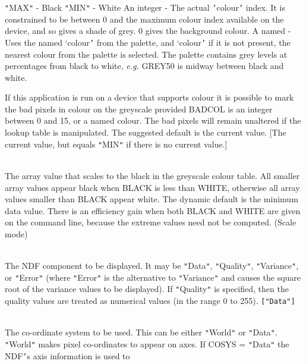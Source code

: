 \documentclass[twoside,11pt]{article}
\newcommand{\sstsubsection}[1]{ \item[{#1}] \mbox{} \\}
\newcommand{\sstsubsection}[1]{\item[{#1}]}
\begin{document}
{{{           {\tt "}MAX{\tt "}       - Black
           {\tt "}MIN{\tt "}       - White
           An integer  - The actual {\tt '}colour{\tt '} index.  It is constrained
                         to be between 0 and the maximum colour index
                         available on the device, and so gives a shade
                         of grey.  0 gives the background colour.
           A named     - Uses the named `colour{\tt '} from the palette, and
           `colour{\tt '}      if it is not present, the nearest colour from
                         the palette is selected.  The palette contains
                         grey levels at percentages from black to white,
                         \emph{e.g.} GREY50 is midway between black and white.

         If this application is run on a device that supports colour
         it is possible to mark the bad pixels in colour on the
         greyscale provided BADCOL is an integer between 0 and 15, or
         a named colour.  The bad pixels will remain unaltered if the
         lookup table is manipulated.  The suggested default is the
         current value. [The current value, but equals {\tt "}MIN{\tt "} if there
         is no current value.]
      }
      \sstsubsection{
         BLACK = \_DOUBLE (Read)
      }{
         The array value that scales to the black in the greyscale
         colour table.  All smaller array values appear black when
         BLACK is less than WHITE, otherwise all array values
         smaller than BLACK appear white.  The dynamic default is the
         minimum data value.   There is an efficiency gain when both
         BLACK and WHITE are given on the command line, because the
         extreme values need not be computed.  (Scale mode)
      }
      \sstsubsection{
         COMP = LITERAL (Read)
      }{
         The NDF component to be displayed.  It may be {\tt "}Data{\tt "},
         {\tt "}Quality{\tt "}, {\tt "}Variance{\tt "}, or {\tt "}Error{\tt "} (where {\tt "}Error{\tt "} is the
         alternative to {\tt "}Variance{\tt "} and causes the square root of the
         variance values to be displayed).  If {\tt "}Quality{\tt "} is specified,
         then the quality values are treated as numerical values (in
         the range 0 to 255). {\tt [{\tt "}Data{\tt "}]}
      }
      \sstsubsection{
         COSYS = LITERAL (Read)
      }{
         The co-ordinate system to be used.  This can be either {\tt "}World{\tt "}
         or {\tt "}Data{\tt "}.  {\tt "}World{\tt "} makes pixel co-ordinates to appear on axes.
         If COSYS = {\tt "}Data{\tt "} the NDF{\tt '}s axis information is used to
}}}
\end{document}
